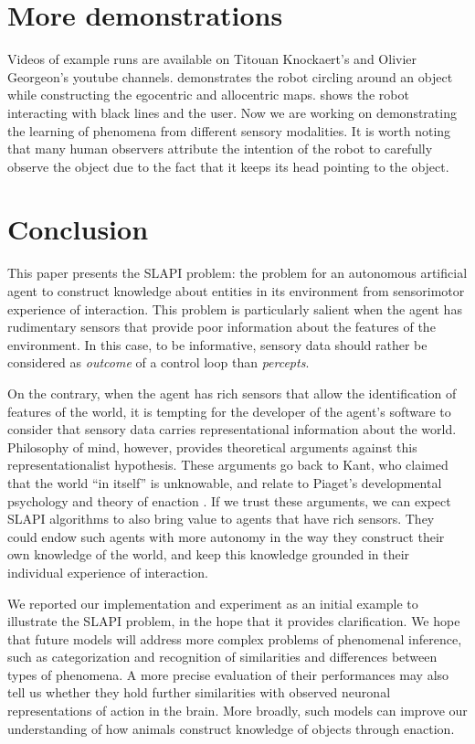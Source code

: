 \documentclass[pmlr]{jmlr}%
\begin{document}
\section{More demonstrations}

Videos of example runs are available on Titouan Knockaert's and Olivier Georgeon's youtube channels.
\cite{knockaert_demonstration_2022} demonstrates the robot circling around an object while constructing the egocentric and allocentric maps. 
\cite{georgeon_demontration_2021} shows the robot interacting with black lines and the user.
Now we are working on demonstrating the learning of phenomena from different sensory modalities. 
It is worth noting that many human observers attribute the intention of the robot to carefully observe the object due to the fact that it keeps its head pointing to the object. 


\section{Conclusion}

This paper presents the SLAPI problem: the problem for an autonomous artificial agent to construct knowledge about entities in its environment from sensorimotor experience of interaction.  
This problem is particularly salient when the agent has rudimentary sensors that provide poor information about the features of the environment. 
In this case, to be informative, sensory data should rather be considered as \textit{outcome} of a control loop than \textit{percepts}.

On the contrary, when the agent has rich sensors that allow the identification of features of the world, it is tempting for the developer of the agent's software to consider that sensory data carries representational information about the world. 
Philosophy of mind, however, provides theoretical arguments against this representationalist hypothesis. 
These arguments go back to Kant, who claimed that the world ``in itself'' is unknowable, and relate to Piaget's developmental psychology and theory of enaction \citep[e.g.,][]{froese_enactive_2009}. 
If we trust these arguments, we can expect SLAPI algorithms to also bring value to agents that have rich sensors. 
They could endow such agents with more autonomy in the way they construct their own knowledge of the world, and keep this knowledge grounded in their individual experience of interaction.

We reported our implementation and experiment as an initial example to illustrate the SLAPI problem, in the hope that it provides clarification. 
We hope that future models will address more complex problems of phenomenal inference, such as categorization and recognition of similarities and differences between types of phenomena. 
A more precise evaluation of their performances may also tell us whether they hold further similarities with observed neuronal representations of action in the brain. 
More broadly, such models can improve our understanding of how animals construct knowledge of objects through enaction. 




\end{document}
